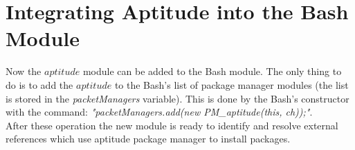 \section{Integrating Aptitude into the Bash Module}\label{sec:aptitude_int}
Now the $aptitude$ module can be added to the Bash module.
The only thing to do is to add the $aptitude$ to the Bash's list of package manager modules (the list is stored in the \emph{packetManagers} variable).
This is done by the Bash's constructor with the command: \emph{"packetManagers.add(new PM\_aptitude(this, ch));"}.\\
After these operation the new module is ready to identify and resolve external references which use aptitude package manager to install packages.